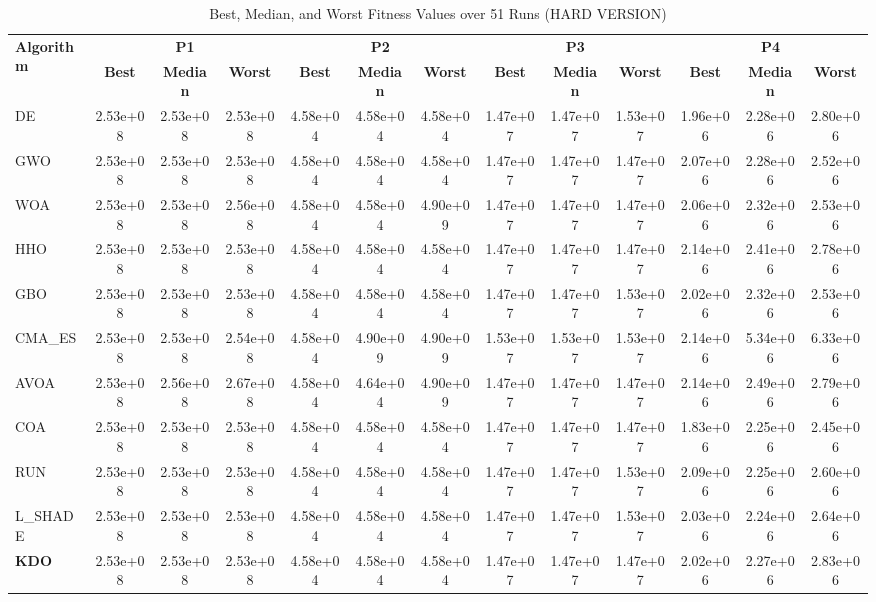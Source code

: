 \begin{table}
\centering
\caption{Best, Median, and Worst Fitness Values over 51 Runs (HARD VERSION)}
\label{tab:best_median_worst}
\tiny
\setlength{\tabcolsep}{2pt}
\begin{tabular}{lcccccccccccc}
\toprule
\multirow{2}{*}{\textbf{Algorithm}} & \multicolumn{3}{c}{\textbf{P1}} & \multicolumn{3}{c}{\textbf{P2}} & \multicolumn{3}{c}{\textbf{P3}} & \multicolumn{3}{c}{\textbf{P4}} \\
\cmidrule(lr){2-4}\cmidrule(lr){5-7}\cmidrule(lr){8-10}\cmidrule(lr){11-13}
 & \textbf{Best} & \textbf{Median} & \textbf{Worst} & \textbf{Best} & \textbf{Median} & \textbf{Worst} & \textbf{Best} & \textbf{Median} & \textbf{Worst} & \textbf{Best} & \textbf{Median} & \textbf{Worst} \\
\midrule
DE & 2.53e+08 & 2.53e+08 & 2.53e+08 & 4.58e+04 & 4.58e+04 & 4.58e+04 & 1.47e+07 & 1.47e+07 & 1.53e+07 & 1.96e+06 & 2.28e+06 & 2.80e+06 \\
GWO & 2.53e+08 & 2.53e+08 & 2.53e+08 & 4.58e+04 & 4.58e+04 & 4.58e+04 & 1.47e+07 & 1.47e+07 & 1.47e+07 & 2.07e+06 & 2.28e+06 & 2.52e+06 \\
WOA & 2.53e+08 & 2.53e+08 & 2.56e+08 & 4.58e+04 & 4.58e+04 & 4.90e+09 & 1.47e+07 & 1.47e+07 & 1.47e+07 & 2.06e+06 & 2.32e+06 & 2.53e+06 \\
HHO & 2.53e+08 & 2.53e+08 & 2.53e+08 & 4.58e+04 & 4.58e+04 & 4.58e+04 & 1.47e+07 & 1.47e+07 & 1.47e+07 & 2.14e+06 & 2.41e+06 & 2.78e+06 \\
GBO & 2.53e+08 & 2.53e+08 & 2.53e+08 & 4.58e+04 & 4.58e+04 & 4.58e+04 & 1.47e+07 & 1.47e+07 & 1.53e+07 & 2.02e+06 & 2.32e+06 & 2.53e+06 \\
CMA_ES & 2.53e+08 & 2.53e+08 & 2.54e+08 & 4.58e+04 & 4.90e+09 & 4.90e+09 & 1.53e+07 & 1.53e+07 & 1.53e+07 & 2.14e+06 & 5.34e+06 & 6.33e+06 \\
AVOA & 2.53e+08 & 2.56e+08 & 2.67e+08 & 4.58e+04 & 4.64e+04 & 4.90e+09 & 1.47e+07 & 1.47e+07 & 1.47e+07 & 2.14e+06 & 2.49e+06 & 2.79e+06 \\
COA & 2.53e+08 & 2.53e+08 & 2.53e+08 & 4.58e+04 & 4.58e+04 & 4.58e+04 & 1.47e+07 & 1.47e+07 & 1.47e+07 & 1.83e+06 & 2.25e+06 & 2.45e+06 \\
RUN & 2.53e+08 & 2.53e+08 & 2.53e+08 & 4.58e+04 & 4.58e+04 & 4.58e+04 & 1.47e+07 & 1.47e+07 & 1.53e+07 & 2.09e+06 & 2.25e+06 & 2.60e+06 \\
L_SHADE & 2.53e+08 & 2.53e+08 & 2.53e+08 & 4.58e+04 & 4.58e+04 & 4.58e+04 & 1.47e+07 & 1.47e+07 & 1.53e+07 & 2.03e+06 & 2.24e+06 & 2.64e+06 \\
\textbf{KDO} & 2.53e+08 & 2.53e+08 & 2.53e+08 & 4.58e+04 & 4.58e+04 & 4.58e+04 & 1.47e+07 & 1.47e+07 & 1.47e+07 & 2.02e+06 & 2.27e+06 & 2.83e+06 \\
\bottomrule
\end{tabular}
\end{table}
